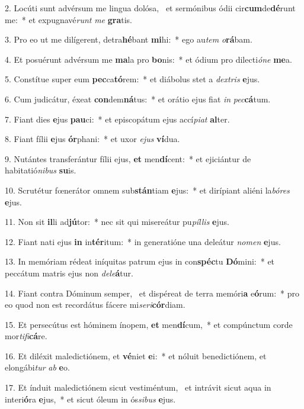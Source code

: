 2. Locúti sunt advérsum me lingua dolósa, \dag\  et sermónibus ódii cir\textbf{cum}de\textbf{dé}runt me:~*  et expugnavé\textit{runt} \textit{me} \textbf{gra}tis.\

3. Pro eo ut me dilígerent, detra\textbf{hé}bant \textbf{mi}hi:~*  ego au\textit{tem} \textit{o}\textbf{rá}bam.\

4. Et posuérunt advérsum me \textbf{ma}la pro \textbf{bo}nis:~*  et ódium pro dilecti\textit{ó}\textit{ne} \textbf{me}a.\

5. Constítue super eum \textbf{pec}ca\textbf{tó}rem:~*  et diábolus stet a \textit{dex}\textit{tris} \textbf{e}jus.\

6. Cum judicátur, éxeat \textbf{con}dem\textbf{ná}tus:~*  et orátio ejus fiat \textit{in} \textit{pec}\textbf{cá}tum.\

7. Fiant dies \textbf{e}jus \textbf{pau}ci:~*  et episcopátum ejus accí\textit{pi}\textit{at} \textbf{al}ter.\

8. Fiant fílii \textbf{e}jus \textbf{ór}phani:~*  et uxor \textit{e}\textit{jus} \textbf{ví}dua.\

9. Nutántes transferántur fílii ejus, \textbf{et} men\textbf{dí}cent:~*  et ejiciántur de habitatió\textit{ni}\textit{bus} \textbf{su}is.\

10. Scrutétur fœnerátor omnem sub\textbf{stán}tiam \textbf{e}jus:~*  et dirípiant aliéni la\textit{bó}\textit{res} \textbf{e}jus.\

11. Non sit \textbf{il}li ad\textbf{jú}tor:~*  nec sit qui misereátur pu\textit{píl}\textit{lis} \textbf{e}jus.\

12. Fiant nati ejus \textbf{in} in\textbf{tér}itum:~*  in generatióne una deleátur \textit{no}\textit{men} \textbf{e}jus.\

13. In memóriam rédeat iníquitas patrum ejus in con\textbf{spéc}tu \textbf{Dó}mini:~*  et peccátum matris ejus non \textit{de}\textit{le}\textbf{á}tur.\

14. Fiant contra Dóminum semper, \dag\  et dispéreat de terra memóri\textbf{a} e\textbf{ó}rum:~*  pro eo quod non est recordátus fácere mi\textit{se}\textit{ri}\textbf{cór}diam.\

15. Et persecútus est hóminem ínopem, \textbf{et} men\textbf{dí}cum,~*  et compúnctum corde mor\textit{ti}\textit{fi}\textbf{cá}re.\

16. Et diléxit maledictiónem, et \textbf{vé}niet \textbf{e}i:~*  et nóluit benedictiónem, et elongábi\textit{tur} \textit{ab} \textbf{e}o.\

17. Et índuit maledictiónem sicut vestiméntum, \dag\  et intrávit sicut aqua in interi\textbf{ó}ra \textbf{e}jus,~*  et sicut óleum in ós\textit{si}\textit{bus} \textbf{e}jus.\

